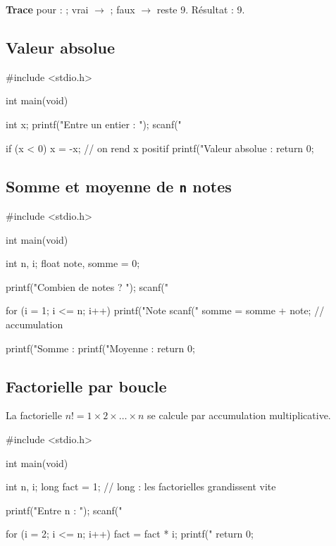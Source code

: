 
\textbf{Trace} pour  :  ;  vrai
$\rightarrow$  ;  faux $\rightarrow$  reste 9.
Résultat : 9.

\subsection{Valeur absolue}

\begin{codec}
#include <stdio.h>

int main(void) {
    int x;
    printf("Entre un entier : ");
    scanf("%

    if (x < 0) {
        x = -x;             // on rend x positif
    }
    printf("Valeur absolue : %
    return 0;
}
\end{codec}

\subsection{Somme et moyenne de \texttt{n} notes}

\begin{codec}
#include <stdio.h>

int main(void) {
    int n, i;
    float note, somme = 0;

    printf("Combien de notes ? ");
    scanf("%

    for (i = 1; i <= n; i++) {
        printf("Note %
        scanf("%
        somme = somme + note;     // accumulation
    }

    printf("Somme : %
    printf("Moyenne : %
    return 0;
}
\end{codec}


\subsection{Factorielle par boucle}

La factorielle $n! = 1 \times 2 \times \dots \times n$ se calcule par accumulation
multiplicative.

\begin{codec}
#include <stdio.h>

int main(void) {
    int n, i;
    long fact = 1;          // long : les factorielles grandissent vite

    printf("Entre n : ");
    scanf("%

    for (i = 2; i <= n; i++) {
        fact = fact * i;
    }
    printf("%
    return 0;
}
\end{codec}

